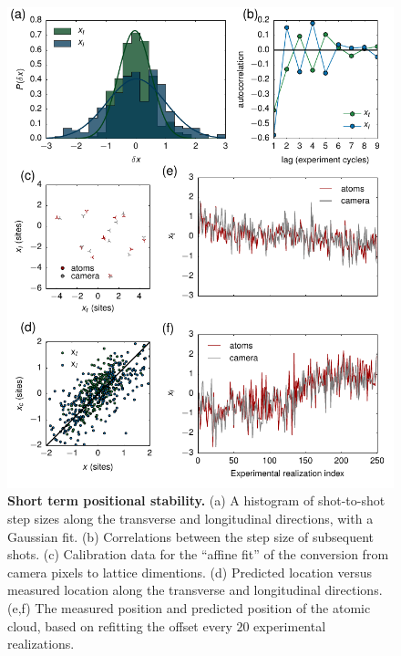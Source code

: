 \documentclass[twocolumn,aps,pra,showpacs,preprintnumbers,bibnotes]{revtex4-1}
\begin{document}
\begin{figure}
  \begin{center}
    \includegraphics{fig/pointing_figure.pdf}
    \caption{\textbf{Short term positional stability.} (a) A histogram of shot-to-shot step sizes along the transverse and longitudinal directions, with a Gaussian fit. (b) Correlations between the step size of subsequent shots. (c) Calibration data for the ``affine fit'' of the conversion from camera pixels to lattice dimentions. (d) Predicted location versus measured location along the transverse and longitudinal directions. (e,f) The measured position and predicted position of the atomic cloud, based on refitting the offset every $20$ experimental realizations.}\label{fig:stability}
  \end{center}
\end{figure}
\end{document}
